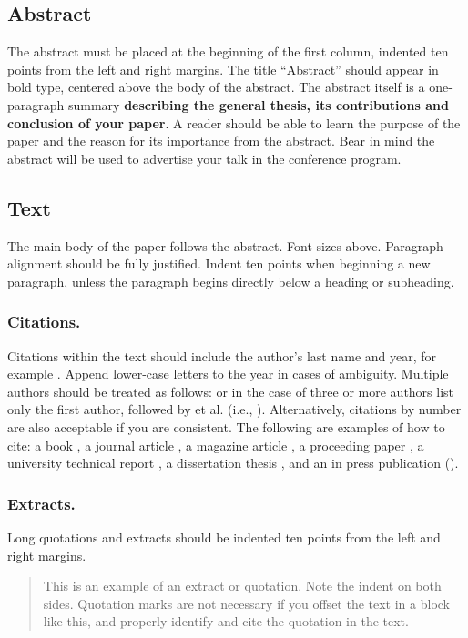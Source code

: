 \documentclass[letterpaper]{article}
\begin{document}
\subsection{Abstract}
The abstract must be placed at the beginning of the first column, 
indented ten points from the left and right margins. 
The title ``Abstract'' should appear in bold type, centered above the 
body of the abstract. The abstract itself is a one-paragraph summary 
{\bf describing the general thesis, its contributions and conclusion of 
your paper}. A reader should be able to learn the purpose of the paper 
and the reason for its importance from the abstract. Bear in mind the 
abstract will be used to advertise your talk in the conference program. 

\subsection{Text}
The main body of the paper follows the abstract. Font sizes above. 
Paragraph alignment should be fully justified.
Indent ten points when beginning a new paragraph, unless the 
paragraph begins directly below a heading or subheading. \\

\subsubsection{Citations.} 
Citations within the text should include the author's 
last name and year, for example \citep{CA2}.
Append lower-case letters to the year in cases of ambiguity. 
Multiple authors should be treated as follows: 
\citep{GE93}
or in the case of three or more authors list only the first author, 
followed by et al. (i.e., \citealt{Aguilar:2014}). 
Alternatively, citations by number are also acceptable if you are consistent. 
The following are examples of how to cite: a book \citep{Engelmore:1986}, a journal article \citep{Robinson:1980}, 
a magazine article \citep{Hasling:1983}, a
proceeding paper \citep{Chu:1993}, 
a university technical report \citep{Rice:1986}, 
a dissertation thesis \citep{Clancey:1979}, and an in press
publication (\citeauthor[in press]{Clancey:inpress}).


\subsubsection{Extracts.} Long quotations and extracts should be indented ten points from the left and right margins.
\begin{quotation}
This is an example of an extract or quotation. 
Note the indent on both sides. 
Quotation marks are not necessary if you offset the text in a block like this, 
and properly identify and cite the quotation in the text. 
\end{quotation}
\end{document}
